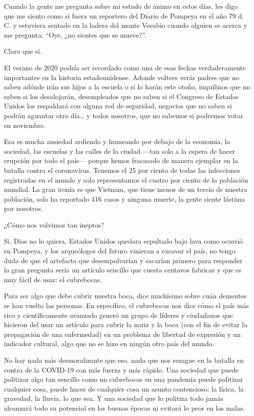 Cuando la gente me pregunta sobre mi estado de ánimo en estos días, les
digo que me siento como si fuera un reportero del Diario de Pompeya en
el año 79 d. C. y estuviera sentado en la ladera del monte Vesubio
cuando alguien se acerca y me pregunta: ``Oye, ¿no sientes que se
mueve?''.

Claro que sí.

El verano de 2020 podría ser recordado como una de esas fechas
verdaderamente importantes en la historia estadounidense. Adonde voltees
verás padres que no saben adónde irán sus hijos a la escuela o si lo
harán este otoño, inquilinos que no saben si los desalojarán,
desempleados que no saben si el Congreso de Estados Unidos los
respaldará con alguna red de seguridad, negocios que no saben si podrán
aguantar otro día\ldots{} y todos nosotros, que no sabemos si podremos
votar en noviembre.

Esa es mucha ansiedad ardiendo y humeando por debajo de la economía, la
sociedad, las escuelas y las calles de la ciudad ---tan solo a la espera
de hacer erupción por todo el país--- porque hemos fracasado de manera
ejemplar en la batalla contra el coronavirus. Tenemos el 25 por ciento
de todas las infecciones registradas en el mundo y solo representamos el
cuatro por ciento de la población mundial. La gran ironía es que
Vietnam, que tiene menos de un tercio de nuestra población, solo ha
reportado 416 casos y ninguna muerte, la gente siente lástima por
nosotros.

¿Cómo nos volvimos tan ineptos?

Si, Dios no lo quiera, Estados Unidos quedara sepultado bajo lava como
ocurrió en Pompeya, y los arqueólogos del futuro vinieran a excavar el
país, no tengo duda de que el artefacto que desempolvarían y sacarían
primero para responder la gran pregunta sería un artículo sencillo que
cuesta centavos fabricar y que es muy fácil de usar: el cubrebocas.

Para ser algo que debe cubrir nuestra boca, dice muchísimo sobre cuán
dementes se han vuelto las personas. En específico, el cubrebocas nos
dice cómo el país más rico y científicamente avanzado generó un grupo de
líderes y ciudadanos que hicieron del usar un artículo para cubrir la
nariz y la boca (con el fin de evitar la propagación de una enfermedad)
en un problema de libertad de expresión y un indicador cultural, algo
que no se hizo en ningún otro país del mundo.

No hay nada más desmoralizante que eso, nada que nos rezague en la
batalla en contra de la COVID-19 con más fuerza y más rápido. Una
sociedad que puede politizar algo tan sencillo como un cubrebocas en una
pandemia puede politizar cualquier cosa, puede hacer de cualquier cosa
un asunto contencioso: la física, la gravedad, la lluvia, lo que sea. Y
una sociedad que lo politiza todo jamás alcanzará todo su potencial en
las buenas épocas ni evitará lo peor en las malas.


